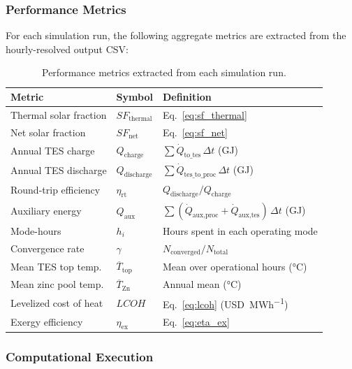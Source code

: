 \documentclass[11pt,review,3p]{elsarticle}
\begin{document}
\subsubsection{Performance Metrics}
\label{sec:metrics}

For each simulation run, the following aggregate metrics are extracted from the hourly-resolved output CSV:

\begin{table}[h]
\centering
\caption{Performance metrics extracted from each simulation run.}
\label{tab:metrics}
\begin{tabular}{lll}
\toprule
Metric & Symbol & Definition \\
\midrule
Thermal solar fraction & $SF_{\text{thermal}}$ & Eq.~\eqref{eq:sf_thermal} \\
Net solar fraction & $SF_{\text{net}}$ & Eq.~\eqref{eq:sf_net} \\
Annual TES charge & $Q_{\text{charge}}$ & $\sum \dot{Q}_{\text{to\_tes}}\,\Delta t$ (GJ) \\
Annual TES discharge & $Q_{\text{discharge}}$ & $\sum \dot{Q}_{\text{tes\_to\_proc}}\,\Delta t$ (GJ) \\
Round-trip efficiency & $\eta_{\text{rt}}$ & $Q_{\text{discharge}} / Q_{\text{charge}}$ \\
Auxiliary energy & $Q_{\text{aux}}$ & $\sum (\dot{Q}_{\text{aux,proc}} + \dot{Q}_{\text{aux,tes}})\,\Delta t$ (GJ) \\
Mode-hours & $h_i$ & Hours spent in each operating mode \\
Convergence rate & $\gamma$ & $N_{\text{converged}} / N_{\text{total}}$ \\
Mean TES top temp. & $\overline{T}_{\text{top}}$ & Mean over operational hours (\si{\celsius}) \\
Mean zinc pool temp. & $\overline{T}_{\text{Zn}}$ & Annual mean (\si{\celsius}) \\
Levelized cost of heat & $LCOH$ & Eq.~\eqref{eq:lcoh} (\si{USD.MWh^{-1}}) \\
Exergy efficiency & $\eta_{\text{ex}}$ & Eq.~\eqref{eq:eta_ex} \\
\bottomrule
\end{tabular}
\end{table}

\subsubsection{Computational Execution}
\label{sec:execution}
\end{document}
